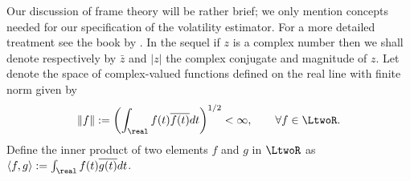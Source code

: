\documentclass[a4paper, 12pt]{article}
\renewcommand{\D}{\ensuremath{d}\xspace}
\begin{document}

Our discussion of  frame theory will be  rather brief; we only mention concepts needed for our specification of the volatility estimator.  For a  more detailed treatment see the book by \cite{Christensen2008}. 
In the sequel if $z$ is a complex number then we shall denote respectively by $\bar{z}$ and $\vert z \vert$ the complex conjugate and magnitude of $z$. Let \LtwoR denote the space of complex-valued functions defined on the real line with finite norm given by 
\begin{align}
  \Vert f \Vert := \left(\int_\real f(t) \overline{f(t)} \D t\right)^{1/2} < \infty, \qquad \forall f \in \LtwoR.\notag
  \label{}
\end{align}
 Define the  inner product of two elements $f$ and $g$ in $\LtwoR$ as $\langle f,g\rangle :=  \int_\real f(t) \overline{g(t)} \D t$.
\end{document}

